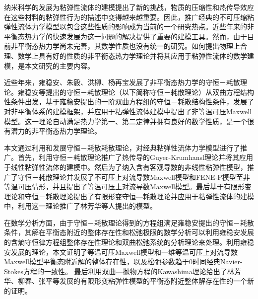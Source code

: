 
\begin{cabstract}
纳米科学的发展为粘弹性流体的建模提出了新的挑战，物质的压缩性和热传导效应在这些材料的粘弹性行为的描述中变得越来越重要。因此，推广经典的不可压缩粘弹性流体力学模型以包含这些性质的影响成为当前的一个研究热点。近些年来的非平衡态热力学的快速发展为这一问题的解决提供了重要的建模工具。然而，由于目前非平衡态热力学尚未完善，其数学性质也没有统一的研究。如何提出物理上合理、数学上具有好的性质的非平衡态热力学理论并将其应用于粘弹性流体的数学建模，是本文研究的主要内容。

近些年来，雍稳安、朱毅、洪柳、杨再宝发展了非平衡态热力学的守恒－耗散理论。雍稳安等提出的守恒－耗散理论（以下简称守恒－耗散理论）从双曲方程结构性条件出发，基于雍稳安提出的一阶双曲方程组的守恒－耗散结构性条件，发展了对非平衡体系的建模框架，并应用于粘弹性流体建模中提出了非等温可压Maxwell模型。这一理论自动满足热力学第一、第二定律并拥有良好的数学性质，是一个很有潜力的非平衡态热力学理论。

本文通过利用和发展守恒－耗散耗散理论，对经典粘弹性流体力学模型进行了推广。首先，利用守恒－耗散理论推广了热传导的Guyer-Krumhansl理论并将其应用于线性粘弹性流体的建模中。然后为了纳入含有客观导数的非线性粘弹性模型，推广了守恒－耗散理论并发展了不可压上对流导数Maxwell模型和FENE-P模型至非等温可压情形，并且提出了等温可压上对流导数Maxwell模型。最后基于有限形变理论和守恒－耗散理论提出了有限形变守恒—耗散理论并应用于粘弹性流体的建模中，利用这一理论推广了林芳华等人提出的模型。

在数学分析方面，由于守恒－耗散理论得到的方程组满足雍稳安提出的守恒－耗散条件，其解在平衡态附近的整体存在性和松弛极限的数学分析可以利用雍稳安发展的含熵守恒律方程组整体存在性理论和双曲松弛系统的分析理论来处理。利用雍稳安发展的理论，本文证明了等温可压Maxwell模型和一维等温可压上对流导数Maxwell模型平衡态附近解的整体存在性，以及松弛参数趋于$0$时同经典Navier-Stokes方程的一致性。%
最后利用双曲—抛物方程的Kawashima理论给出了林芳华、柳春、张平等发展的有限形变粘弹性模型的平衡态附近整体解存在性的一个新的证明。


\end{cabstract}

